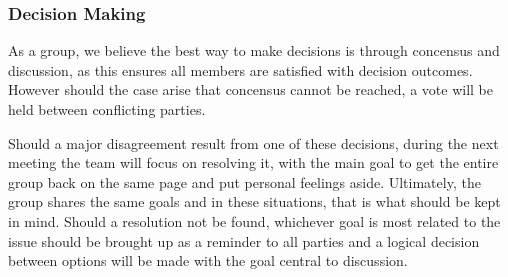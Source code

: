 \documentclass{article}
\begin{document}

\subsubsection*{Decision Making} 

\iffalse
\wss{How will you make decisions in your group? Consensus?  Vote? How will you
handle disagreements? }
\fi

As a group, we believe the best way to make decisions is through concensus and discussion, 
as this ensures all members are satisfied with decision outcomes. However should the case 
arise that concensus cannot be reached, a vote will be held between conflicting parties.

Should a major disagreement result from one of these decisions, during the next meeting 
the team will focus on resolving it, with the main goal to get the entire group back on 
the same page and put personal feelings aside. Ultimately, the group shares the same goals 
and in these situations, that is what should be kept in mind. Should a resolution not be found, 
whichever goal is most related to the issue should be brought up as a reminder to all 
parties and a logical decision between options will be made with the goal central to discussion.
\end{document}
